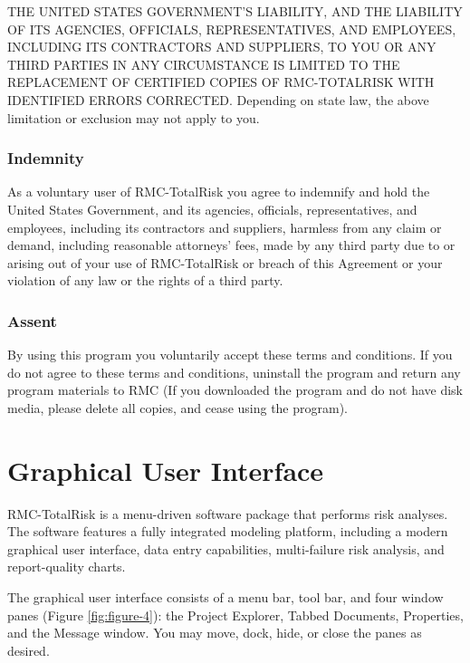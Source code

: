 \documentclass[
]{book}
\begin{document}
THE UNITED STATES GOVERNMENT'S LIABILITY, AND THE LIABILITY OF ITS AGENCIES, OFFICIALS, REPRESENTATIVES, AND EMPLOYEES, INCLUDING ITS CONTRACTORS AND SUPPLIERS, TO YOU OR ANY THIRD PARTIES IN ANY CIRCUMSTANCE IS LIMITED TO THE REPLACEMENT OF CERTIFIED COPIES OF RMC-TOTALRISK WITH IDENTIFIED ERRORS CORRECTED. Depending on state law, the above limitation or exclusion may not apply to you.

\hypertarget{indemnity}{%
\subsection{Indemnity}\label{indemnity}}

As a voluntary user of RMC-TotalRisk you agree to indemnify and hold the United States Government, and its agencies, officials, representatives, and employees, including its contractors and suppliers, harmless from any claim or demand, including reasonable attorneys' fees, made by any third party due to or arising out of your use of RMC-TotalRisk or breach of this Agreement or your violation of any law or the rights of a third party.

\hypertarget{assent}{%
\subsection{Assent}\label{assent}}

By using this program you voluntarily accept these terms and conditions. If you do not agree to these terms and conditions, uninstall the program and return any program materials to RMC (If you downloaded the program and do not have disk media, please delete all copies, and cease using the program).

\hypertarget{gui}{%
\chapter{Graphical User Interface}\label{gui}}

RMC-TotalRisk is a menu-driven software package that performs risk analyses. The software features a fully integrated modeling platform, including a modern graphical user interface, data entry capabilities, multi-failure risk analysis, and report-quality charts.

The graphical user interface consists of a menu bar, tool bar, and four window panes (Figure \ref{fig:figure-4}): the Project Explorer, Tabbed Documents, Properties, and the Message window. You may move, dock, hide, or close the panes as desired.
\end{document}
